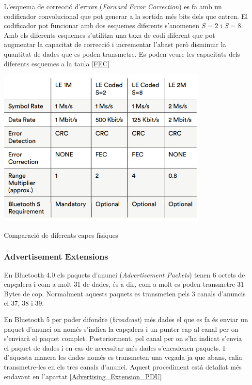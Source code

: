 L'esquema de correcció d'errors (\textit{Forward Error Correction}) es fa amb un codificador convolucional que pot generar a la sortida més bits dels que entren. El codificador pot funcionar amb dos esquemes diferents s'anomenen $S=2$ i $S=8$.
Amb els diferents esquemes s'utilitza una taxa de codi diferent que pot augmentar la capacitat de correcció i incrementar l'abast però disminuir la quantitat de dades que es poden transmetre.
Es poden veure les capacitats dels diferents esquemes a la taula \ref{FEC} 

\begin{table}[htb]
	\begin{center}
		\includegraphics[width=0.8\textwidth]{./images/LE_PHY.png}
		\caption{Comparació de diferents capes físiques}
		\label{FEC}
	\end{center}
\end{table}

\subsubsection{Advertisement Extensions}
\label{Advertisement_Extensions}
En Bluetooth 4.0 els paquets d'anunci (\textit{Advertisement Packets}) tenen 6 octets de capçalera i com a molt 31 de dades, és a dir, com a molt es poden transmetre 31 Bytes de cop.
Normalment aquests paquets es transmeten pels 3 canals d'anuncis el 37, 38 i 39.

En Bluetooth 5 per poder difondre (\textit{broadcast}) més dades el que es fa és enviar un paquet d'anunci on només s'indica la capçalera i un punter cap al canal per on s'enviarà el paquet complet.
Posteriorment, pel canal per on s'ha indicat s'envia el paquet de dades i en cas de necessitar més dades s'encadenen paquets.
I d'aquesta manera les dades només es transmeten una vegada ja que abans, calia transmetre-les en els tres canals d'anunci.
Aquest procediment està detallat més endavant en l'apartat  \ref{Advertising_Extension_PDU}

